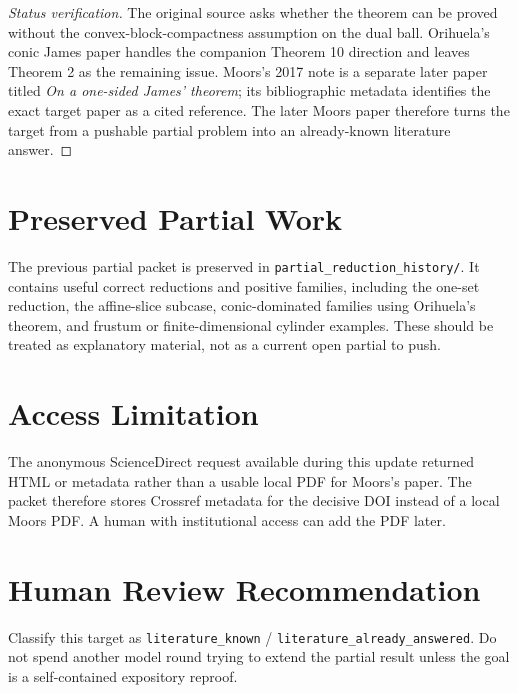 \documentclass[11pt]{article}
\begin{document}
\begin{proof}[Status verification]
The original source asks whether the theorem can be proved without the
convex-block-compactness assumption on the dual ball. Orihuela's conic James
paper handles the companion Theorem 10 direction and leaves Theorem 2 as the
remaining issue. Moors's 2017 note is a separate later paper titled
\emph{On a one-sided James' theorem}; its bibliographic metadata identifies
the exact target paper as a cited reference. The later Moors paper therefore
turns the target from a pushable partial problem into an already-known
literature answer.
\end{proof}

\section*{Preserved Partial Work}

The previous partial packet is preserved in
\texttt{partial\_reduction\_history/}. It contains useful correct reductions
and positive families, including the one-set reduction, the affine-slice
subcase, conic-dominated families using Orihuela's theorem, and frustum or
finite-dimensional cylinder examples. These should be treated as explanatory
material, not as a current open partial to push.

\section*{Access Limitation}

The anonymous ScienceDirect request available during this update returned
HTML or metadata rather than a usable local PDF for Moors's paper. The packet
therefore stores Crossref metadata for the decisive DOI instead of a local
Moors PDF. A human with institutional access can add the PDF later.

\section*{Human Review Recommendation}

Classify this target as \texttt{literature\_known} /
\texttt{literature\_already\_answered}. Do not spend another model round
trying to extend the partial result unless the goal is a self-contained
expository reproof.
\end{document}
